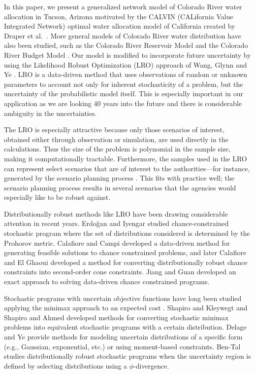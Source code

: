 \documentclass[11pt]{article}
\begin{document}
In this paper, we present a generalized network model of Colorado River water allocation in Tucson, Arizona motivated by the CALVIN (CALifornia Value Integrated Network) optimal water allocation model of California created by Draper et al.\ \cite{draper_etal_03}.
More general models of Colorado River water distribution have also been studied, such as the Colorado River Reservoir Model \cite{christensen2004effects} and the Colorado River Budget Model \cite{barnett2009sustainable}.
Our model is modified to incorporate future uncertainty by using the Likelihood Robust Optimization (LRO) approach of Wang, Glynn and Ye \cite{wang2010likelihood}.
LRO is a data-driven method that uses observations of random or unknown parameters to account not only for inherent stochasticity of a problem, but the uncertainty of the probabilistic model itself.
This is especially important in our application as we are looking 40 years into the future and there is considerable ambiguity in the uncertainties.

The LRO is especially attractive because only those scenarios of interest, obtained either through observation or simulation, are used directly in the calculations.
Thus the size of the problem is polynomial in the sample size, making it computationally tractable.
Furthermore, the samples used in the LRO can represent select scenarios that are of interest to the authorities---for instance, generated by the scenario planning process \cite{cityofTucsonWaterPlan,usbr_11}.
This fits with practice well; the scenario planning process results in several scenarios that the agencies would especially like to be robust against.

Distributionally robust methods like LRO have been drawing considerable attention in recent years.
Erdo{\u{g}}an and Iyengar \cite{erdogan2006ambiguous} studied chance-constrained stochastic program where the set of distributions considered is determined by the Prohorov metric.
Calafiore and Campi \cite{calafiore2005uncertain} developed a data-driven method for generating feasible solutions to chance constrained problems, and later Calafiore and El Ghaoui \cite{calafiore2006distributionally} developed a method for converting distributionally robust chance constraints into second-order cone constraints.
Jiang and Guan \cite{jiang2012data} developed an exact approach to solving data-driven chance constrained programs.

Stochastic programs with uncertain objective functions have long been studied applying the minimax approach to an expected cost \cite{dupacova_87}.
Shapiro and Kleywegt \cite{shapiro2002minimax} and Shapiro and Ahmed \cite{shapiro2004class} developed methods for converting stochastic minimax problems into equivalent stochastic programs with a certain distribution.
Delage and Ye \cite{delage_ye_10} provide methods for modeling uncertain distributions of a specific form (e.g., Gaussian, exponential, etc.) or using moment-based constraints.
Ben-Tal \cite{bental2011robust} studies distributionally robust stochastic programs when the uncertainty region is defined by selecting distributions using a $\phi$-divergence.
\end{document}
